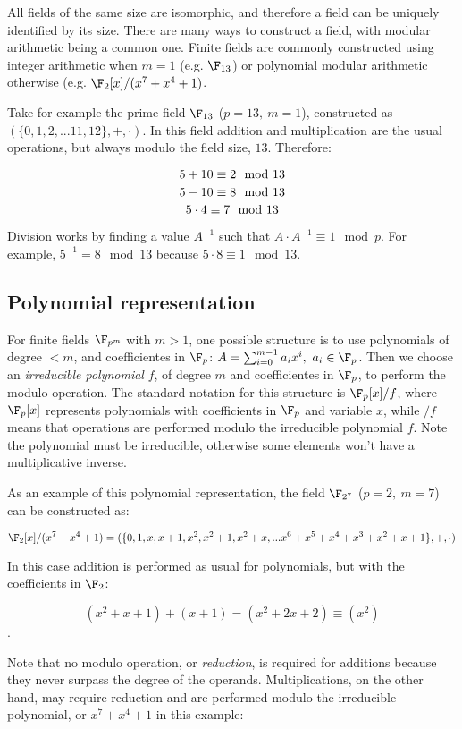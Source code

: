 All fields of the same size are isomorphic, and therefore a field can be uniquely identified by its size. There are many ways to construct a field, with modular arithmetic being a common one. Finite fields are commonly constructed using integer arithmetic when $m=1$ (e.g. $\F_{13}$) or polynomial modular arithmetic otherwise (e.g. $\F_{2}[x]/(x^7+x^4+1)$.

Take for example the prime field $\F_{13}$ ($p=13,~m=1$), constructed as $(\{0, 1, 2, ... 11, 12\}, +, \cdot)$. In this field addition and multiplication are the usual operations, but always modulo the field size, $13$. Therefore:

$$5 + 10 \equiv 2 \mod 13 \\$$
$$5 - 10 \equiv 8 \mod 13 \\$$
$$5 \cdot 4 \equiv 7 \mod 13 \\$$

Division works by finding a value $A^{-1}$ such that $A \cdot A^{-1} \equiv 1 \mod p$. For example, $5^{-1} = 8 \mod 13$ because $5 \cdot 8 \equiv 1 \mod 13$.

\subsection{Polynomial representation}

For finite fields $\F_{p^m}$ with $m > 1$, one possible structure is to use polynomials of degree $<m$, and coefficientes in $\F_{p}$: $A = \sum_{i=0}^{m-1} a_i x^i,~a_i \in \F_{p}$. Then we choose an \emph{irreducible polynomial} $f$, of degree $m$ and coefficientes in $\F_{p}$, to perform the modulo operation. The standard notation for this structure is $\F_p[x]/f$, where $\F_p[x]$ represents polynomials with coefficients in $\F_p$ and variable $x$, while $/f$ means that operations are performed modulo the irreducible polynomial $f$. Note the polynomial must be irreducible, otherwise some elements won't have a multiplicative inverse.

As an example of this polynomial representation, the field $\F_{2^7}$ ($p=2,~m=7$) can be constructed as:

$$\F_{2}[x]/(x^7+x^4+1) = (\{0, 1, x, x+1, x^2, x^2+1, x^2+x, ... x^6+x^5+x^4+x^3+x^2+x+1\}, +, \cdot)$$

In this case addition is performed as usual for polynomials, but with the coefficients in $\F_2$:

$$(x^2+x+1) + (x+1) = (x^2+2x+2) \equiv (x^2)$$.

Note that no modulo operation, or \emph{reduction}, is required for additions because they never surpass the degree of the operands. Multiplications, on the other hand, may require reduction and are performed modulo the irreducible polynomial, or $x^7+x^4+1$ in this example:

